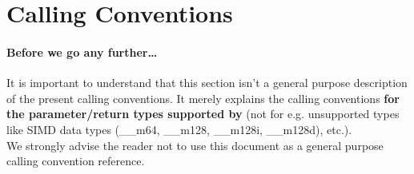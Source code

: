 %
%
%
%

\newpage

\section{Calling Conventions}

\paragraph{Before we go any further\ldots}

It is important to understand that this section isn't a general
purpose description of the present calling conventions.
It merely explains the calling conventions \textbf{for the parameter/return types
supported by \dc} (not for e.g. unsupported types like SIMD data types
(\_\_m64, \_\_m128, \_\_m128i, \_\_m128d), etc.).\\ We strongly advise the
reader not to use this document as a general purpose calling convention
reference.

\clearpage
\clearpage
\clearpage
\clearpage
\clearpage
\clearpage
\clearpage
\clearpage
\clearpage


